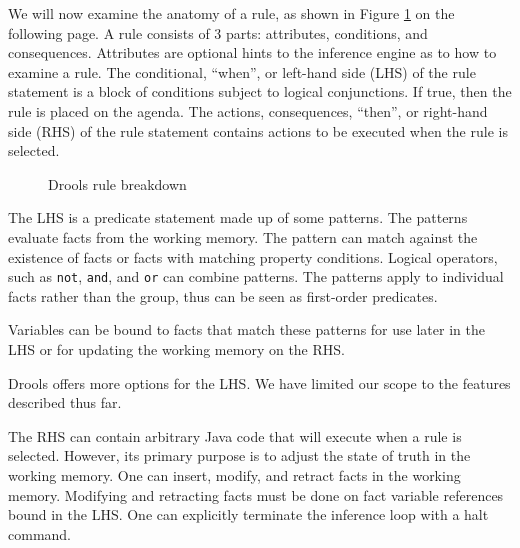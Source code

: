 We will now examine the anatomy of a rule, as shown in Figure \ref{fig:Drools_Rule_Breakdown} on the following page.
A rule consists of 3 parts: attributes, conditions, and consequences.
Attributes are optional hints to the inference engine as to how to examine a rule.
The conditional, ``when'', or left-hand side (LHS) of the rule statement is a block of conditions subject to logical conjunctions. 
If true, then the rule is placed on the agenda.
The actions, consequences, ``then'', or right-hand side (RHS) of the rule statement contains actions to be executed when the rule is selected.

\begin{figure}[h]
    \centering
    \caption{Drools rule breakdown}
    \label{fig:Drools_Rule_Breakdown}
\end{figure}

The LHS is a predicate statement made up of some patterns.
The patterns evaluate facts from the working memory.
The pattern can match against the existence of facts or facts with matching property conditions.
Logical operators, such as \texttt{not}, \texttt{and}, and \texttt{or} can combine patterns.
The patterns apply to individual facts rather than the group, thus can be seen as first-order predicates.

Variables can be bound to facts that match these patterns for use later in the LHS or for updating the working memory on the RHS.

Drools offers more options for the LHS.
We have limited our scope to the features described thus far.

The RHS can contain arbitrary Java code that will execute when a rule is selected.
However, its primary purpose is to adjust the state of truth in the working memory.
One can insert, modify, and retract facts in the working memory.
Modifying and retracting facts must be done on fact variable references bound in the LHS.
One can explicitly terminate the inference loop with a halt command.

